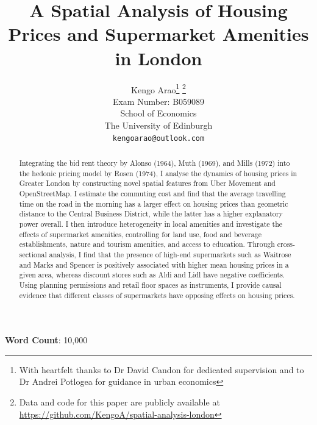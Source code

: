 \documentclass{article}
\title{A Spatial Analysis of Housing Prices and Supermarket Amenities in London}
\author{
  \large{Kengo Arao}\thanks{With heartfelt thanks to Dr David Candon for dedicated supervision and to Dr Andrei Potlogea for guidance in urban economics}      \thanks{Data and code for this paper are publicly available at \href{https://github.com/KengoA/spatial-analysis-london}{https://github.com/KengoA/spatial-analysis-london}} \\
  Exam Number: B059089 \\
  School of Economics\\
  The University of Edinburgh\\
  \texttt{kengoarao@outlook.com}
}
\begin{document}
\maketitle

\begin{abstract}
Integrating the bid rent theory by Alonso (1964), Muth (1969), and Mills (1972) into the hedonic pricing model by Rosen (1974), I analyse the dynamics of housing prices in Greater London by constructing novel spatial features from Uber Movement and OpenStreetMap. I estimate the commuting cost and find that the average travelling time on the road in the morning has a larger effect on housing prices than geometric distance to the Central Business District, while the latter has a higher explanatory power overall. I then introduce heterogeneity in local amenities and investigate the effects of supermarket amenities, controlling for land use, food and beverage establishments, nature and tourism amenities, and access to education. Through cross-sectional analysis, I find that the presence of high-end supermarkets such as Waitrose and Marks and Spencer is positively associated with higher mean housing prices in a given area, whereas discount stores such as Aldi and Lidl have negative coefficients. Using planning permissions and retail floor spaces as instruments, I provide causal evidence that different classes of supermarkets have opposing effects on housing prices.

\end{abstract}

\begin{center}
    \textbf{Word Count}: 10,000
\end{center}

\newpage
\tableofcontents


\newpage
\end{document}
